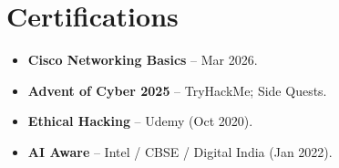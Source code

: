 \documentclass[a4paper,10pt]{article}
\newlength{\mainwidth}
\newlength{\bodyheight}
\begin{document}
\begin{minipage}[t]{\mainwidth}
\begin{minipage}[t][\bodyheight][s]{\linewidth}
\section*{Certifications}
\begin{itemize}
    \item \textbf{Cisco Networking Basics} -- Mar 2026.
    \item \textbf{Advent of Cyber 2025} -- TryHackMe; Side Quests.
    \item \textbf{Ethical Hacking} -- Udemy (Oct 2020).
    \item \textbf{AI Aware} -- Intel / CBSE / Digital India (Jan 2022).
\end{itemize}
\end{minipage}
\end{minipage}
\end{document}
